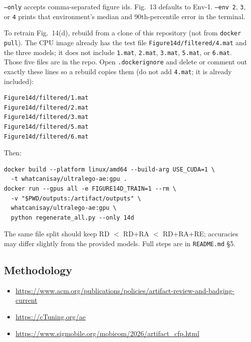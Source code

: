 \documentclass[10pt,twocolumn]{article}
\begin{document}
\texttt{--only} accepts comma-separated figure ids.
Fig.~13 defaults to Env-1. \texttt{--env 2}, \texttt{3}, or \texttt{4}
prints that environment's median and 90th-percentile error in the
terminal.

To retrain Fig.~14(d), rebuild from a clone of this repository
(not from \texttt{docker pull}). The CPU image already has the test
file \texttt{Figure14d/filtered/4.mat} and the three models; it does
not include \texttt{1.mat}, \texttt{2.mat}, \texttt{3.mat},
\texttt{5.mat}, or \texttt{6.mat}. Those five files are in the repo.
Open \texttt{.dockerignore} and delete or comment out exactly these
lines so a rebuild copies them (do not add \texttt{4.mat}; it is
already included):
\begin{lstlisting}
Figure14d/filtered/1.mat
Figure14d/filtered/2.mat
Figure14d/filtered/3.mat
Figure14d/filtered/5.mat
Figure14d/filtered/6.mat
\end{lstlisting}
Then:
\begin{lstlisting}
docker build --platform linux/amd64 --build-arg USE_CUDA=1 \
  -t whatcanisay/ultralego-ae:gpu .
docker run --gpus all -e FIGURE14D_TRAIN=1 --rm \
  -v "$PWD/outputs:/artifact/outputs" \
  whatcanisay/ultralego-ae:gpu \
  python regenerate_all.py --only 14d
\end{lstlisting}
The same file split should keep RD $<$ RD+RA $<$ RD+RA+RE; accuracies
may differ slightly from the provided models. Full steps are in
\texttt{README.md} §5.

\subsection{Methodology}

\begin{itemize}
  \item \url{https://www.acm.org/publications/policies/artifact-review-and-badging-current}
  \item \url{https://cTuning.org/ae}
  \item \url{https://www.sigmobile.org/mobicom/2026/artifact_cfp.html}
\end{itemize}
\end{document}
